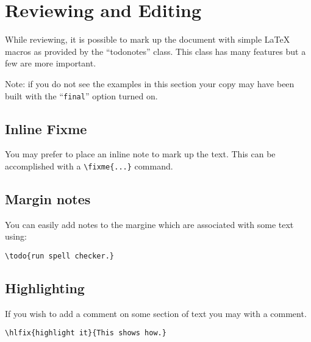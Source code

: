\chapter{Reviewing and Editing}
\label{ch:review}


While reviewing, it is possible to mark up the document with simple
\LaTeX{} macros as provided by the ``todonotes'' class.
This class has many features but a few are more important.

Note: if you do not see the examples in this section your copy may
have been built with the ``\texttt{final}'' option turned on.

\section{Inline Fixme}

You may prefer to place an inline note to mark up the text.
This can be accomplished with a  \verb|\fixme{...}| command.

\section{Margin notes}

You can easily add notes to the margine  which
are associated with some text using:

\begin{verbatim}
\todo{run spell checker.}
\end{verbatim}


\section{Highlighting}

If you wish to add a comment on some section of text you may
with a comment.


\begin{verbatim}
\hlfix{highlight it}{This shows how.}
\end{verbatim}


